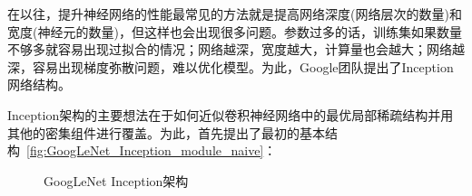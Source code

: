 在以往，提升神经网络的性能最常见的方法就是提高网络深度(网络层次的数量)和宽度(神经元的数量)，但这样也会出现很多问题。参数过多的话，训练集如果数量不够多就容易出现过拟合的情况；网络越深，宽度越大，计算量也会越大；网络越深，容易出现梯度弥散问题，难以优化模型。为此，Google团队提出了Inception网络结构。

Inception架构的主要想法在于如何近似卷积神经网络中的最优局部稀疏结构并用其他的密集组件进行覆盖。为此，首先提出了最初的基本结构~\ref{fig:GoogLeNet_Inception_module_naive}：

\begin{figure}[htbp]
	\centering
	\centering
	\centering
	\caption{GoogLeNet Inception架构}
	\label{fig:GoogLeNet_Inception}
\end{figure}

